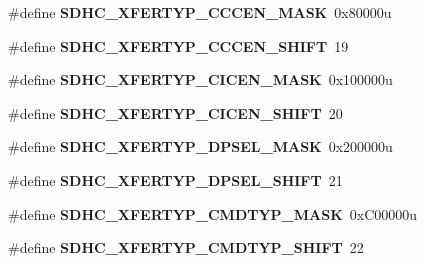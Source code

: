 \begin{DoxyCompactItemize}
\item 
\hypertarget{group___s_d_h_c___register___masks_ga685761802ba9bd3a16540f0b4cf1815d}{}\#define {\bfseries S\+D\+H\+C\+\_\+\+X\+F\+E\+R\+T\+Y\+P\+\_\+\+C\+C\+C\+E\+N\+\_\+\+M\+A\+S\+K}~0x80000u\label{group___s_d_h_c___register___masks_ga685761802ba9bd3a16540f0b4cf1815d}

\item 
\hypertarget{group___s_d_h_c___register___masks_ga8d90ea7df50316ee6c8902df84662c4c}{}\#define {\bfseries S\+D\+H\+C\+\_\+\+X\+F\+E\+R\+T\+Y\+P\+\_\+\+C\+C\+C\+E\+N\+\_\+\+S\+H\+I\+F\+T}~19\label{group___s_d_h_c___register___masks_ga8d90ea7df50316ee6c8902df84662c4c}

\item 
\hypertarget{group___s_d_h_c___register___masks_ga6ab41eef488a5bd6074f0ce44d67fe92}{}\#define {\bfseries S\+D\+H\+C\+\_\+\+X\+F\+E\+R\+T\+Y\+P\+\_\+\+C\+I\+C\+E\+N\+\_\+\+M\+A\+S\+K}~0x100000u\label{group___s_d_h_c___register___masks_ga6ab41eef488a5bd6074f0ce44d67fe92}

\item 
\hypertarget{group___s_d_h_c___register___masks_ga23f6e1c33faf0b718dfaaef43b678084}{}\#define {\bfseries S\+D\+H\+C\+\_\+\+X\+F\+E\+R\+T\+Y\+P\+\_\+\+C\+I\+C\+E\+N\+\_\+\+S\+H\+I\+F\+T}~20\label{group___s_d_h_c___register___masks_ga23f6e1c33faf0b718dfaaef43b678084}

\item 
\hypertarget{group___s_d_h_c___register___masks_ga3230581622fc9670367e7deaf2c3a95f}{}\#define {\bfseries S\+D\+H\+C\+\_\+\+X\+F\+E\+R\+T\+Y\+P\+\_\+\+D\+P\+S\+E\+L\+\_\+\+M\+A\+S\+K}~0x200000u\label{group___s_d_h_c___register___masks_ga3230581622fc9670367e7deaf2c3a95f}

\item 
\hypertarget{group___s_d_h_c___register___masks_ga4de27d59ffd9269e2d4e9b61fa61eb5a}{}\#define {\bfseries S\+D\+H\+C\+\_\+\+X\+F\+E\+R\+T\+Y\+P\+\_\+\+D\+P\+S\+E\+L\+\_\+\+S\+H\+I\+F\+T}~21\label{group___s_d_h_c___register___masks_ga4de27d59ffd9269e2d4e9b61fa61eb5a}

\item 
\hypertarget{group___s_d_h_c___register___masks_gad4ea839bc838b6f865a31a7348910355}{}\#define {\bfseries S\+D\+H\+C\+\_\+\+X\+F\+E\+R\+T\+Y\+P\+\_\+\+C\+M\+D\+T\+Y\+P\+\_\+\+M\+A\+S\+K}~0x\+C00000u\label{group___s_d_h_c___register___masks_gad4ea839bc838b6f865a31a7348910355}

\item 
\hypertarget{group___s_d_h_c___register___masks_ga69a977a39e49c356bb10ec98ca77abdd}{}\#define {\bfseries S\+D\+H\+C\+\_\+\+X\+F\+E\+R\+T\+Y\+P\+\_\+\+C\+M\+D\+T\+Y\+P\+\_\+\+S\+H\+I\+F\+T}~22\label{group___s_d_h_c___register___masks_ga69a977a39e49c356bb10ec98ca77abdd}


\end{DoxyCompactItemize}
